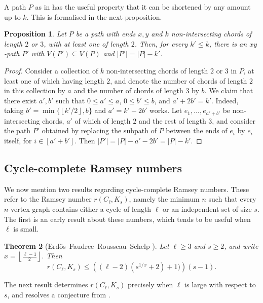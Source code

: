 \documentclass[11pt,english]{article}
\theoremstyle{plain}
\newtheorem{theorem}{Theorem}[section]
\newtheorem{proposition}[theorem]{Proposition}
\theoremstyle{definition}
\theoremstyle{remark}
\newcommand{\floor}[1]{
	\left\lfloor #1 \right\rfloor
}
\begin{document}
	A path $P$ as in  has the useful property that it can be shortened by any amount up to $k$. This is formalised in the next proposition.

	\begin{proposition} \label{prop:chords}
		Let $P$ be a path with ends $x,y$ and $k$ non-intersecting chords of length $2$ or $3$, with at least one of length $2$.
		Then, for every $k' \le k$, there is an $xy$-path $P'$ with $V(P') \subseteq V(P)$ and $|P'| = |P| - k'$.
	\end{proposition}

	\begin{proof}
		Consider a collection of $k$ non-intersecting chords of length $2$ or $3$ in $P$, at least one of which having length $2$, and denote the number of chords of length $2$ in this collection by $a$ and the number of chords of length $3$ by $b$.
		We claim that there exist $a',b'$ such that $0 \le a' \le a$, $0 \le b' \le b$, and $a' + 2b' = k'$.
		Indeed, taking $b' = \min\{\floor{k'/2}, b\}$ and $a' = k' - 2b'$ works. Let $e_1, \ldots, e_{a'+b'}$ be non-intersecting chords, $a'$ of which of length $2$ and the rest of length $3$, and consider the path $P'$ obtained by replacing the subpath of $P$ between the ends of $e_i$ by $e_i$ itself, for $i \in [a'+b']$. Then $|P'| = |P| - a' - 2b' = |P| - k'$.
	\end{proof}

\subsection{Cycle-complete Ramsey numbers}
	We now mention two results regarding cycle-complete Ramsey numbers. These refer to the Ramsey number $r(C_{\ell}, K_s)$, namely the minimum $n$ such that every $n$-vertex graph contains either a cycle of length $\ell$ or an independent set of size $s$.
	The first is an early result about these numbers, which tends to be useful when $\ell$ is small.

	\begin{theorem}[Erd\H{o}s--Faudree--Rousseau--Schelp \cite{erdos1978cycle}] \label{thm:ramsey-erdos}
		Let $\ell \ge 3$ and $s \ge 2$, and write $x = \floor{\frac{\ell-1}{2}}$. Then 
		\begin{equation*}
			r(C_{\ell}, K_s) \le \left( (\ell-2)(s^{1/x} + 2) + 1 )\right)(s-1).
		\end{equation*}
	\end{theorem}

	The next result determines $r(C_{\ell}, K_s)$ precisely when $\ell$ is large with respect to $s$, and resolves a conjecture from \cite{erdos1978cycle}. 
\end{document}
